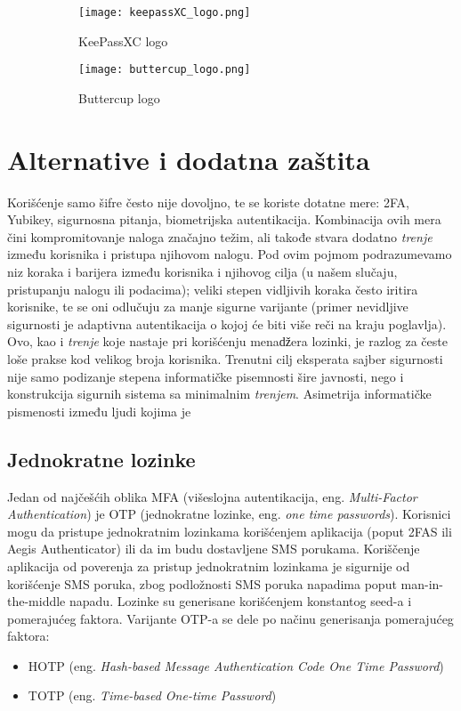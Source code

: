 \documentclass[fleqn, 12pt]{article}
\begin{document}
\begin{figure}[h]
    \centering
    \begin{subfigure}[b]{0.45\linewidth}
        \centering
        \texttt{[image: keepassXC\_logo.png]}
        \caption{KeePassXC logo}
        \label{fig:image1}
    \end{subfigure}
    \hfill
    \begin{subfigure}[b]{0.45\linewidth}
        \centering
        \texttt{[image: buttercup\_logo.png]}
        \caption{Buttercup logo}
        \label{fig:image2}
    \end{subfigure}
    \caption{}
    \label{fig:side_by_side}
\end{figure}

\newpage
\section{Alternative i dodatna zaštita}
\indent Korišćenje samo šifre često nije dovoljno, te se koriste dotatne mere: 2FA, Yubikey, sigurnosna pitanja, biometrijska autentikacija. Kombinacija ovih mera čini kompromitovanje naloga značajno težim, ali takođe stvara dodatno \emph{trenje} između korisnika i pristupa njihovom nalogu. Pod ovim pojmom podrazumevamo niz koraka i barijera između korisnika i njihovog cilja (u našem slučaju, pristupanju nalogu ili podacima); veliki stepen vidljivih koraka često iritira korisnike, te se oni odlučuju za manje sigurne varijante (primer nevidljive sigurnosti je adaptivna autentikacija o kojoj će biti više reči na kraju poglavlja). Ovo, kao i \emph{trenje} koje nastaje pri korišćenju menaǆera lozinki, je razlog za česte loše prakse kod velikog broja korisnika. Trenutni cilj eksperata sajber sigurnosti nije samo podizanje stepena informatičke pisemnosti šire javnosti, nego i konstrukcija sigurnih sistema sa minimalnim \emph{trenjem}. Asimetrija informatičke pismenosti između ljudi kojima je 

\subsection{Jednokratne lozinke}
Jedan od najčešćih oblika MFA (višeslojna autentikacija, eng. \emph{Multi-Factor Authentication}) je OTP (jednokratne lozinke, eng. \emph{one time passwords}). Korisnici mogu da pristupe jednokratnim lozinkama korišćenjem aplikacija (poput 2FAS ili Aegis Authenticator) ili da im budu dostavljene SMS porukama. Koriščenje aplikacija od poverenja za pristup jednokratnim lozinkama je sigurnije od korišćenje SMS poruka, zbog podložnosti SMS poruka napadima poput man-in-the-middle napadu. Lozinke su generisane korišćenjem konstantog seed-a i pomerajućeg faktora. Varijante OTP-a se dele po načinu generisanja pomerajućeg faktora:
\begin{itemize}
    \item HOTP (eng. \emph{Hash-based Message Authentication Code One Time Password})
    \item TOTP (eng. \emph{Time-based One-time Password})
\end{itemize}
\end{document}
